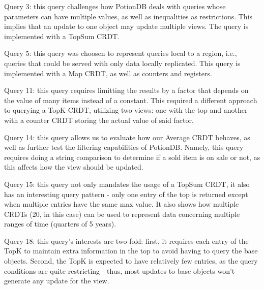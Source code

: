 \documentclass{vldb}
\begin{document}
\begin{compactitem}
	\item Query 3: this query challenges how PotionDB deals with queries whose parameters can have multiple values, as well as inequalities as restrictions. 
	This implies that an update to one object may update multiple views. 
	The query is implemented with a TopSum CRDT. %
	\item Query 5: this query was choosen to represent queries local to a region, i.e., queries that could be served with only data locally replicated. %
	This query is implemented with a Map CRDT, as well as counters and registers.
	\item Query 11: this query requires limitting the results by a factor that depends on the value of many items instead of a constant.
	This required a different approach to querying a TopK CRDT, utilizing two views: one with the top and another with a counter CRDT storing the actual value of said factor.
	\item Query 14: this query allows us to evaluate how our Average CRDT behaves, as well as further test the filtering capabilities of PotionDB.
	Namely, this query requires doing a string comparison to determine if a sold item is on sale or not, as this affects how the view should be updated.
	\item Query 15: this query not only mandates the usage of a TopSum CRDT, it also has an interesting query pattern - only one entry of the top is returned except when multiple entries have the same max value.
	It also shows how multiple CRDTs (20, in this case) can be used to represent data concerning multiple ranges of time (quarters of 5 years).
	\item Query 18: this query's interests are two-fold: %
	first, it requires each entry of the TopK to maintain extra information in the top to avoid having to query the base objects.
	Second, the TopK is expected to have relatively few entries, as the query conditions are quite restricting - thus, most updates to base objects won't generate any update for the view.
\end{compactitem}
\end{document}
